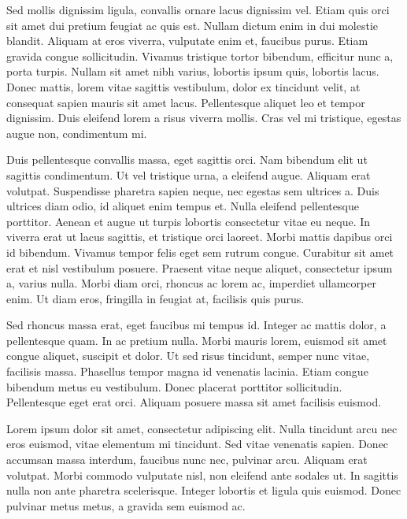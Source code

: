 \documentclass[a4paper, 12pt]{article}
\begin{document}
	Sed mollis dignissim ligula, convallis ornare lacus dignissim vel. Etiam quis orci sit amet dui pretium feugiat ac quis est. Nullam dictum enim in dui molestie blandit. Aliquam at eros viverra, vulputate enim et, faucibus purus. Etiam gravida congue sollicitudin. Vivamus tristique tortor bibendum, efficitur nunc a, porta turpis. Nullam sit amet nibh varius, lobortis ipsum quis, lobortis lacus. Donec mattis, lorem vitae sagittis vestibulum, dolor ex tincidunt velit, at consequat sapien mauris sit amet lacus. Pellentesque aliquet leo et tempor dignissim. Duis eleifend lorem a risus viverra mollis. Cras vel mi tristique, egestas augue non, condimentum mi.
	
	Duis pellentesque convallis massa, eget sagittis orci. Nam bibendum elit ut sagittis condimentum. Ut vel tristique urna, a eleifend augue. Aliquam erat volutpat. Suspendisse pharetra sapien neque, nec egestas sem ultrices a. Duis ultrices diam odio, id aliquet enim tempus et. Nulla eleifend pellentesque porttitor. Aenean et augue ut turpis lobortis consectetur vitae eu neque. In viverra erat ut lacus sagittis, et tristique orci laoreet. Morbi mattis dapibus orci id bibendum. Vivamus tempor felis eget sem rutrum congue. Curabitur sit amet erat et nisl vestibulum posuere. Praesent vitae neque aliquet, consectetur ipsum a, varius nulla. Morbi diam orci, rhoncus ac lorem ac, imperdiet ullamcorper enim. Ut diam eros, fringilla in feugiat at, facilisis quis purus.
	
	Sed rhoncus massa erat, eget faucibus mi tempus id. Integer ac mattis dolor, a pellentesque quam. In ac pretium nulla. Morbi mauris lorem, euismod sit amet congue aliquet, suscipit et dolor. Ut sed risus tincidunt, semper nunc vitae, facilisis massa. Phasellus tempor magna id venenatis lacinia. Etiam congue bibendum metus eu vestibulum. Donec placerat porttitor sollicitudin. Pellentesque eget erat orci. Aliquam posuere massa sit amet facilisis euismod.
	
	Lorem ipsum dolor sit amet, consectetur adipiscing elit. Nulla tincidunt arcu nec eros euismod, vitae elementum mi tincidunt. Sed vitae venenatis sapien. Donec accumsan massa interdum, faucibus nunc nec, pulvinar arcu. Aliquam erat volutpat. Morbi commodo vulputate nisl, non eleifend ante sodales ut. In sagittis nulla non ante pharetra scelerisque. Integer lobortis et ligula quis euismod. Donec pulvinar metus metus, a gravida sem euismod ac.
	
\end{document}
